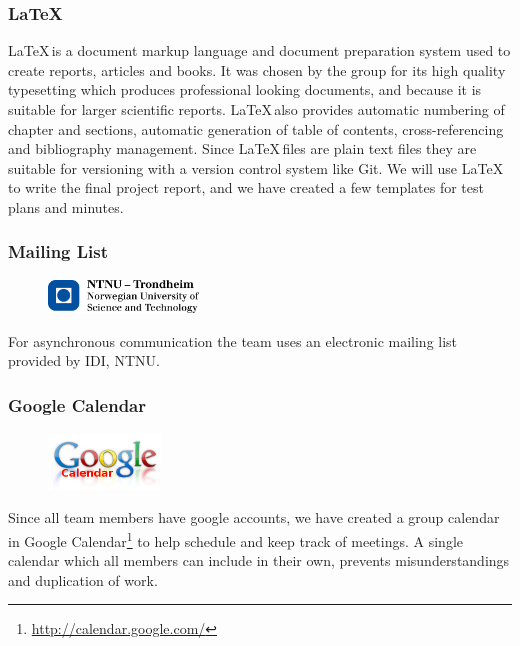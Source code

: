\subsubsection{\LaTeX}
\LaTeX \,is a document markup language and document preparation system used to
create reports, articles and books. It was chosen by the group for its 
high quality typesetting which produces professional looking documents, and 
because it is suitable for larger scientific reports. \LaTeX \,also provides
automatic numbering of chapter and sections, automatic generation of table of
contents, cross-referencing and bibliography management. Since \LaTeX \,files
are plain text files they are suitable for versioning with a version control
system like Git. We will use \LaTeX \,to write the final project report, and we
have created a few templates for test plans and minutes.

\subsubsection{Mailing List}
\begin{figure}
	\vspace{-20pt}
	\includegraphics[width=4cm]{./planning/img/ntnu_logo}
	\vspace{-20pt}
\end{figure}
For asynchronous communication the team uses an electronic mailing list
provided by IDI, NTNU.

\subsubsection{Google Calendar}
\begin{figure}
	\vspace{-20pt}
	\includegraphics[width=3cm]{./planning/img/google_calendar_logo}
	\vspace{-20pt}
\end{figure}
Since all team members have google accounts, we have created a group calendar
in Google Calendar\footnote{\url{http://calendar.google.com/}}
to help schedule and keep track of meetings. A single calendar which all
members can include in their own, prevents misunderstandings and duplication
of work.

